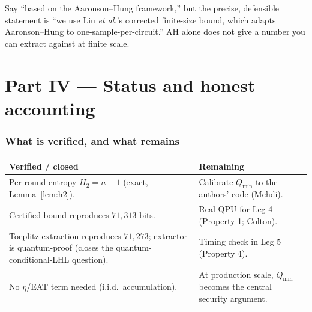 \documentclass[11pt]{article}
\theoremstyle{definition}
\theoremstyle{plain}
\newcommand{\Qmin}{Q_{\min}}
\begin{document}
\begin{plain}
Say ``based on the Aaronson--Hung framework,'' but the precise, defensible statement is
``we use Liu \emph{et al.}'s corrected finite-size bound, which adapts Aaronson--Hung to
one-sample-per-circuit.'' AH alone does not give a number you can extract against at finite
scale.
\end{plain}

\part*{Part IV --- Status and honest accounting}

\section{What is verified, and what remains}
\begin{center}
\renewcommand{\arraystretch}{1.25}
\begin{tabular}{>{\raggedright}p{} p{}}
\toprule
\textbf{Verified / closed} & \textbf{Remaining} \\
\midrule
Per-round entropy $H_2=n-1$ (exact, Lemma~\ref{lem:h2}). & Calibrate $\Qmin$ to the authors' code (Mehdi). \\
Certified bound reproduces $71{,}313$ bits. & Real QPU for Leg 4 (Property 1; Colton). \\
Toeplitz extraction reproduces $71{,}273$; extractor is quantum-proof (closes the quantum-conditional-LHL question). & Timing check in Leg 5 (Property 4). \\
No $\eta$/EAT term needed (i.i.d.\ accumulation). & At production scale, $\Qmin$ becomes the central security argument. \\
\bottomrule
\end{tabular}
\end{center}
\end{document}
